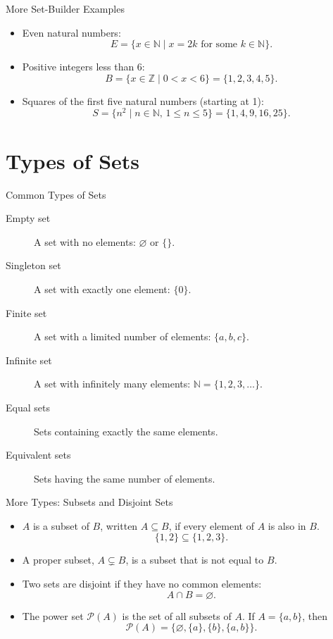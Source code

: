 \documentclass[aspectratio=169,11pt]{beamer}
\begin{document}
\begin{frame}{More Set-Builder Examples}
\begin{itemize}
  \item Even natural numbers:
  \[
    E=\{x\in\mathbb{N}\mid x=2k\text{ for some }k\in\mathbb{N}\}.
  \]
  \item Positive integers less than 6:
  \[
    B=\{x\in\mathbb{Z}\mid 0<x<6\}=\{1,2,3,4,5\}.
  \]
  \item Squares of the first five natural numbers (starting at 1):
  \[
    S=\{n^2\mid n\in\mathbb{N},\,1\leq n\leq5\}
      =\{1,4,9,16,25\}.
  \]
\end{itemize}
\end{frame}

\section{Types of Sets}

\begin{frame}{Common Types of Sets}
\begin{description}
  \item[Empty set] A set with no elements: \(\varnothing\) or \(\{\}\).
  \item[Singleton set] A set with exactly one element: \(\{0\}\).
  \item[Finite set] A set with a limited number of elements: \(\{a,b,c\}\).
  \item[Infinite set] A set with infinitely many elements:
        \(\mathbb{N}=\{1,2,3,\ldots\}\).
  \item[Equal sets] Sets containing exactly the same elements.
  \item[Equivalent sets] Sets having the same number of elements.
\end{description}
\end{frame}

\begin{frame}{More Types: Subsets and Disjoint Sets}
\begin{itemize}
  \item \(A\) is a \alert{subset} of \(B\), written \(A\subseteq B\), if
        every element of \(A\) is also in \(B\).
  \[
    \{1,2\}\subseteq\{1,2,3\}.
  \]
  \item A \alert{proper subset}, \(A\subsetneq B\), is a subset that is not
        equal to \(B\).
  \item Two sets are \alert{disjoint} if they have no common elements:
  \[
    A\cap B=\varnothing.
  \]
  \item The \alert{power set} \(\mathcal{P}(A)\) is the set of all subsets
        of \(A\). If \(A=\{a,b\}\), then
  \[
    \mathcal{P}(A)=\{\varnothing,\{a\},\{b\},\{a,b\}\}.
  \]
\end{itemize}
\end{frame}
\end{document}
